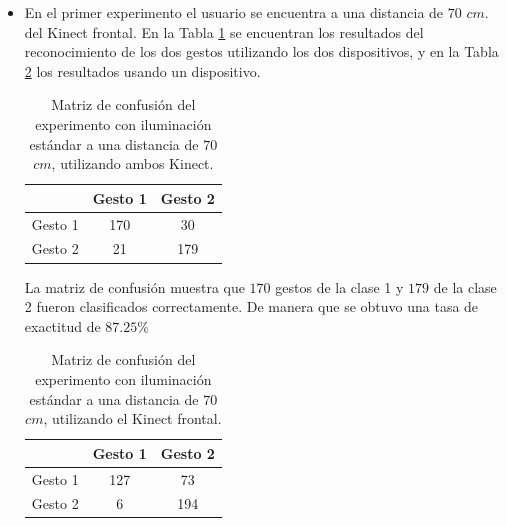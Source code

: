 \begin{itemize}

\item En el primer experimento el usuario se encuentra a una distancia de $70$ $cm.$ del Kinect frontal. En la Tabla \ref{table:70L2K} se encuentran los resultados del reconocimiento de los dos gestos utilizando los dos dispositivos, y en la Tabla \ref{table:70L1K} los resultados usando un dispositivo.  


\begin{table}[h!] 
\begin{center}
\begin{tabular}{ r || c | c |}  
        & Gesto 1 & Gesto 2 \\ \hline \hline  
Gesto 1 & 170  &  30  \\ \hline  
Gesto 2 & 21   & 179 \\   
\end{tabular}
\end{center} 
\caption{Matriz de confusión del experimento con iluminación estándar a una distancia de $70$ $cm$, utilizando ambos Kinect.} 
\label{table:70L2K}
\end{table}

La matriz de confusión muestra que $170$ gestos de la clase 1 y $179$ de la clase 2 fueron clasificados correctamente. De manera que se obtuvo una tasa de exactitud de $87.25 \%$  

\begin{table}[h!] 
\begin{center}
\begin{tabular}{ r || c | c |} 
        & Gesto 1 & Gesto 2 \\ \hline \hline  
Gesto 1 & 127  &  73  \\ \hline  
Gesto 2 & 6    &  194 \\   
\end{tabular}
\end{center} 
\caption{Matriz de confusión del experimento con iluminación estándar a una distancia de $70$ $cm$, utilizando el Kinect frontal.}
\label{table:70L1K}
\end{table}


\end{itemize}
